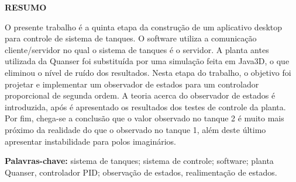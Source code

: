 \documentclass[a4paper,12pt]{article}
\begin{document}
\newpage


\thispagestyle{empty}

\begin{center}
{\large \textbf{RESUMO}}
\end{center}

\vspace{3cm}

\begin{flushleft}

\hspace{4ex}O presente trabalho é a quinta etapa da construção de um aplicativo desktop para controle de sistema de tanques. O software utiliza a comunicação cliente/servidor no qual o sistema de tanques é o servidor. A planta antes utilizada da Quanser foi substituída por uma simulação feita em Java3D, o que eliminou o nível de ruído dos resultados. Nesta etapa do trabalho, o objetivo foi projetar e implementar um observador de estados para um controlador proporcional de segunda ordem. A teoria acerca do observador de estados é introduzida, após é apresentado os resultados dos testes de controle da planta. Por fim, chega-se a conclusão que o valor observado no tanque 2 é muito mais próximo da realidade do que o observado no tanque 1, além deste último apresentar instabilidade para polos imaginários. \\

\end{flushleft}

\vspace{1.5cm}

\textbf{Palavras-chave:} sistema de tanques; sistema de controle; software; planta Quanser, controlador PID; observação de estados, realimentação de estados.

\newpage


\thispagestyle{empty}

\begin{center}
\listoffigures
\end{center}

\newpage


\thispagestyle{empty}

\begin{center}
\tableofcontents
\end{center}
\end{document}
